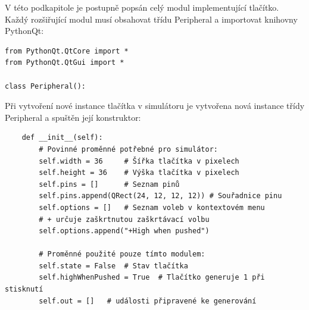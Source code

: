 V této podkapitole je postupně popsán celý modul implementující tlačítko. Každý rozšiřující modul musí obsahovat třídu Peripheral a importovat knihovny PythonQt:

\begin{lstlisting}
from PythonQt.QtCore import *
from PythonQt.QtGui import *

class Peripheral():
\end{lstlisting}

Při vytvoření nové instance tlačítka v simulátoru je vytvořena nová instance třídy Peripheral a spuštěn její konstruktor:

\begin{lstlisting}
	def __init__(self):
		# Povinné proměnné potřebné pro simulátor:
		self.width = 36		# Šířka tlačítka v pixelech
		self.height = 36	# Výška tlačítka v pixelech
		self.pins = []		# Seznam pinů
		self.pins.append(QRect(24, 12, 12, 12))	# Souřadnice pinu
		self.options = []	# Seznam voleb v kontextovém menu
		# + určuje zaškrtnutou zaškrtávací volbu
		self.options.append("+High when pushed")

		# Proměnné použité pouze tímto modulem:
		self.state = False	# Stav tlačítka
		self.highWhenPushed = True	# Tlačítko generuje 1 při stisknutí
		self.out = []	# události připravené ke generování
\end{lstlisting}

